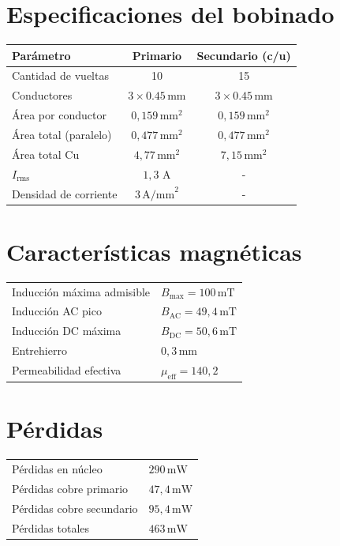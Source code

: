 \documentclass[a4paper,11pt]{article}
\begin{document}
\section*{Especificaciones del bobinado}

\begin{tabular}{lcc}
\toprule
Parámetro & Primario & Secundario (c/u) \\
\midrule
Cantidad de vueltas & 10 & 15 \\
Conductores & $3 \times 0.45\,\text{mm}$ & $3 \times 0.45\,\text{mm}$ \\
Área por conductor & $0{,}159\,\text{mm}^2$ & $0{,}159\,\text{mm}^2$ \\
Área total (paralelo) & $0{,}477\,\text{mm}^2$ & $0{,}477\,\text{mm}^2$ \\
Área total Cu & $4{,}77\,\text{mm}^2$ & $7{,}15\,\text{mm}^2$\\
$I_{\text{rms}}$ & $1{,}3 \text{ A}$ & -\\
Densidad de corriente & $3\,\text{A/mm}^2$ & - \\
\bottomrule
\end{tabular}

\vspace{5mm}

\section*{Características magnéticas}

\begin{tabular}{ll}
\toprule
Inducción máxima admisible & $B_{\max} = 100\,\text{mT}$ \\
Inducción AC pico & $B_{\text{AC}} = 49{,}4\,\text{mT}$ \\
Inducción DC máxima & $B_{\text{DC}} = 50{,}6\,\text{mT}$ \\
Entrehierro & $0{,}3\,\text{mm}$ \\
Permeabilidad efectiva & $\mu_{\text{eff}} = 140{,}2$ \\
\bottomrule
\end{tabular}

\vspace{5mm}

\section*{Pérdidas}

\begin{tabular}{ll}
\toprule
Pérdidas en núcleo & $290\,\text{mW}$ \\
Pérdidas cobre primario & $47{,}4\,\text{mW}$ \\
Pérdidas cobre secundario & $95{,}4\,\text{mW}$ \\
Pérdidas totales & $463\,\text{mW}$ \\
\bottomrule
\end{tabular}
\end{document}
